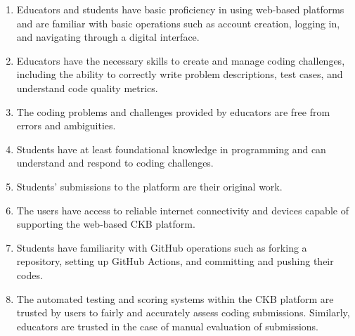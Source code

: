 \begin{enumerate}
    \item Educators and students have basic proficiency in using web-based platforms and are familiar with basic operations such as account creation, logging in, and navigating through a digital interface.

    \item Educators have the necessary skills to create and manage coding challenges, including the ability to correctly write problem descriptions, test cases, and understand code quality metrics.

    \item The coding problems and challenges provided by educators are free from errors and ambiguities.

    \item Students have at least foundational knowledge in programming and can understand and respond to coding challenges.

    \item Students' submissions to the platform are their original work.

    \item The users have access to reliable internet connectivity and devices capable of supporting the web-based CKB platform.

    \item Students have familiarity with GitHub operations such as forking a repository, setting up GitHub Actions, and committing and pushing their codes.

    \item The automated testing and scoring systems within the CKB platform are trusted by users to fairly and accurately assess coding submissions. Similarly, educators are trusted in the case of manual evaluation of submissions.

\end{enumerate}
